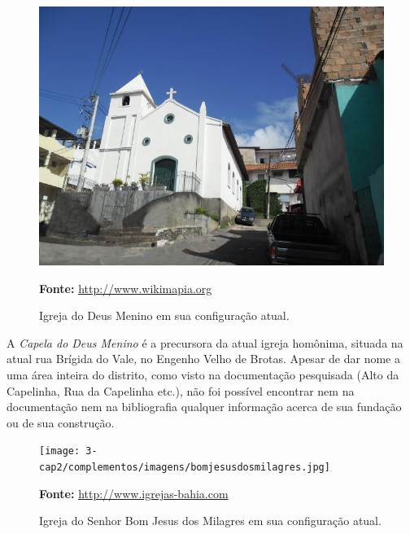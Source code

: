 \begin{figure}[!htp]
\caption{Igreja do Deus Menino em sua configuração atual.}
\centering
\includegraphics[width=1\textwidth]{3-cap2/complementos/imagens/deusmenino.jpg}{\footnotesize \par \textbf{Fonte:} \url{http://www.wikimapia.org} \par}
\end{figure}

A \textit{Capela do Deus Menino} é a precursora da atual igreja homônima, situada na atual rua Brígida do Vale, no Engenho Velho de Brotas. Apesar de dar nome a uma área inteira do distrito, como visto na documentação pesquisada (Alto da Capelinha, Rua da Capelinha etc.), não foi possível encontrar nem na documentação nem na bibliografia qualquer informação acerca de sua fundação ou de sua construção.  

\begin{figure}[!htp]
\centering
\caption{Igreja do Senhor Bom Jesus dos Milagres em sua configuração atual.}
\texttt{[image: 3-cap2/complementos/imagens/bomjesusdosmilagres.jpg]}{\footnotesize \par \textbf{Fonte:} \url{http://www.igrejas-bahia.com} \par}
\end{figure}

